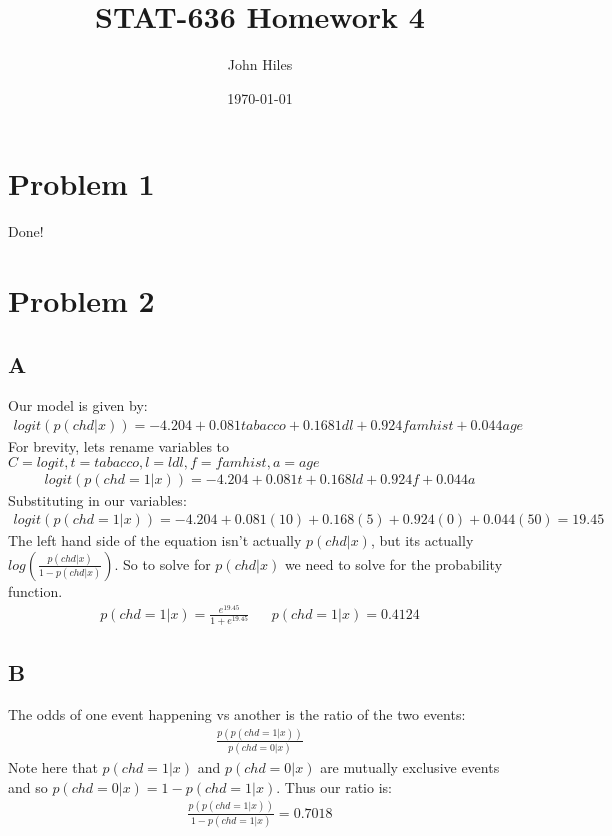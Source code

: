 \documentclass{article}
\title{STAT-636 Homework 4}
\author{John Hiles}
\date\today
\begin{document}
\maketitle %

\section*{Problem 1}
Done!
\section*{Problem 2}
\subsection*{A}
Our model is given by:
\begin{align*}
logit(p(chd|x)) = -4.204+0.081tabacco + 0.1681dl + 0.924famhist + 0.044age
\end{align*}
For brevity, lets rename variables to $C=logit, t=tabacco, l=ldl, f=famhist, a=age$
\begin{align*}
logit(p(chd=1|x)) = -4.204+0.081t + 0.168ld + 0.924f + 0.044a
\end{align*}
Substituting in our variables:
\begin{align*}
logit(p(chd=1|x)) = -4.204+0.081 (10) + 0.168(5) + 0.924(0) + 0.044(50) = 19.45
\end{align*}
The left hand side of the equation isn't actually $p(chd|x)$, but its actually $log(\frac{p(chd|x)}{1-p(chd|x)})$. So to solve for $p(chd|x)$ we need to solve for the probability function.
\begin{align*}
p(chd=1|x) = \frac{e^{19.45}}{1+e^{19.45}} && p(chd=1|x) = 0.4124
\end{align*}
\subsection*{B}
The odds of one event happening vs another is the ratio of the two events:
\begin{align*}
\frac{p(p(chd=1|x))}{p(chd=0|x)}
\end{align*}
Note here that $p(chd=1|x)$ and $p(chd=0|x)$ are mutually exclusive events and so $p(chd=0|x) = 1-p(chd=1|x)$. Thus our ratio is:
\begin{align*}
\frac{p(p(chd=1|x))}{1-p(chd=1|x)} = 0.7018
\end{align*}
\end{document}
